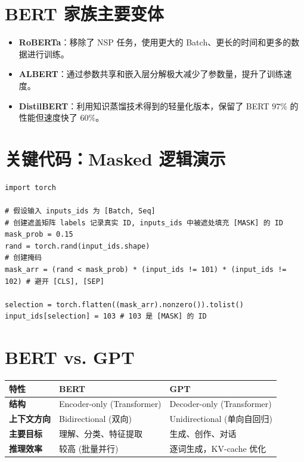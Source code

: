 \documentclass[12pt, a4paper]{book}
\begin{document}
\section{BERT 家族主要变体}
\begin{itemize}
    \item \textbf{RoBERTa}：移除了 NSP 任务，使用更大的 Batch、更长的时间和更多的数据进行训练。
    \item \textbf{ALBERT}：通过参数共享和嵌入层分解极大减少了参数量，提升了训练速度。
    \item \textbf{DistilBERT}：利用知识蒸馏技术得到的轻量化版本，保留了 BERT $97\%$ 的性能但速度快了 $60\%$。
\end{itemize}

\section{关键代码：Masked 逻辑演示}
\begin{lstlisting}
import torch

# 假设输入 inputs_ids 为 [Batch, Seq]
# 创建遮盖矩阵 labels 记录真实 ID, inputs_ids 中被遮处填充 [MASK] 的 ID
mask_prob = 0.15
rand = torch.rand(input_ids.shape)
# 创建掩码
mask_arr = (rand < mask_prob) * (input_ids != 101) * (input_ids != 102) # 避开 [CLS], [SEP]

selection = torch.flatten((mask_arr).nonzero()).tolist()
input_ids[selection] = 103 # 103 是 [MASK] 的 ID
\end{lstlisting}

\section{BERT vs. GPT}
\begin{table}[h]
\centering
\begin{tabularx}{\textwidth}{|l|X|X|}
\hline
\textbf{特性} & \textbf{BERT} & \textbf{GPT} \\
\hline
\textbf{结构} & Encoder-only (Transformer) & Decoder-only (Transformer) \\
\hline
\textbf{上下文方向} & Bidirectional (双向) & Unidirectional (单向自回归) \\
\hline
\textbf{主要目标} & 理解、分类、特征提取 & 生成、创作、对话 \\
\hline
\textbf{推理效率} & 较高 (批量并行) & 逐词生成，KV-cache 优化 \\
\hline
\end{tabularx}
\end{table}
\end{document}
